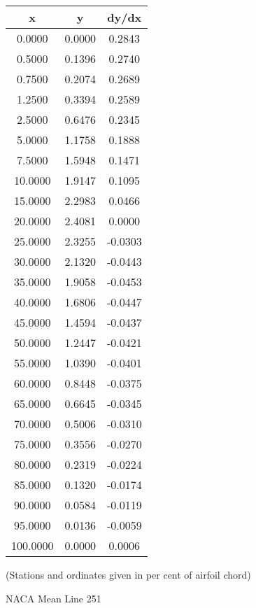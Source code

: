 \documentclass[11pt]{book}
\begin{document}
 \vspace{8mm}
 \begin{tabular}{|c|c|c|}  \hline
 x & y & dy/dx \\
 \hline
0.0000 & 0.0000 & 0.2843 \\
0.5000 & 0.1396 & 0.2740 \\
0.7500 & 0.2074 & 0.2689 \\
1.2500 & 0.3394 & 0.2589 \\
2.5000 & 0.6476 & 0.2345 \\
5.0000 & 1.1758 & 0.1888 \\
7.5000 & 1.5948 & 0.1471 \\
10.0000 & 1.9147 & 0.1095 \\
15.0000 & 2.2983 & 0.0466 \\
20.0000 & 2.4081 & 0.0000 \\
25.0000 & 2.3255 & -0.0303 \\
30.0000 & 2.1320 & -0.0443 \\
35.0000 & 1.9058 & -0.0453 \\
40.0000 & 1.6806 & -0.0447 \\
45.0000 & 1.4594 & -0.0437 \\
50.0000 & 1.2447 & -0.0421 \\
55.0000 & 1.0390 & -0.0401 \\
60.0000 & 0.8448 & -0.0375 \\
65.0000 & 0.6645 & -0.0345 \\
70.0000 & 0.5006 & -0.0310 \\
75.0000 & 0.3556 & -0.0270 \\
80.0000 & 0.2319 & -0.0224 \\
85.0000 & 0.1320 & -0.0174 \\
90.0000 & 0.0584 & -0.0119 \\
95.0000 & 0.0136 & -0.0059 \\
100.0000 & 0.0000 & 0.0006 \\
 \hline
 \end{tabular}
 \vspace{8mm}

(Stations and ordinates given in per cent of airfoil chord)

 \newpage
 \label{ml251}
 \begin{Large}
 NACA Mean Line 251
 \end{Large}
  
\end{document}
